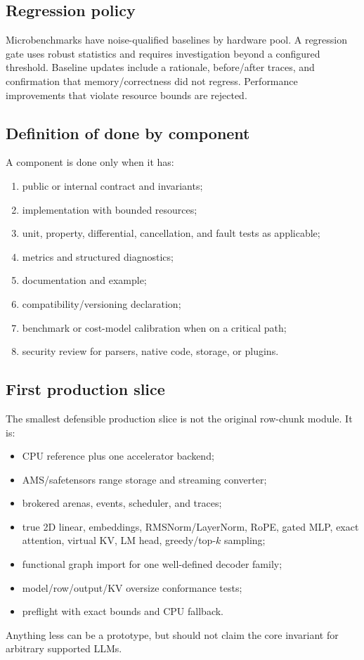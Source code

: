 \subsection{Regression policy}

Microbenchmarks have noise-qualified baselines by hardware pool. A regression gate uses robust statistics and requires investigation beyond a configured threshold. Baseline updates include a rationale, before/after traces, and confirmation that memory/correctness did not regress. Performance improvements that violate resource bounds are rejected.

\subsection{Definition of done by component}

A component is done only when it has:

\begin{enumerate}
  \item public or internal contract and invariants;
  \item implementation with bounded resources;
  \item unit, property, differential, cancellation, and fault tests as applicable;
  \item metrics and structured diagnostics;
  \item documentation and example;
  \item compatibility/versioning declaration;
  \item benchmark or cost-model calibration when on a critical path;
  \item security review for parsers, native code, storage, or plugins.
\end{enumerate}

\subsection{First production slice}

The smallest defensible production slice is not the original row-chunk module. It is:

\begin{itemize}
  \item CPU reference plus one accelerator backend;
  \item AMS/safetensors range storage and streaming converter;
  \item brokered arenas, events, scheduler, and traces;
  \item true 2D linear, embeddings, RMSNorm/LayerNorm, RoPE, gated MLP, exact attention, virtual KV, LM head, greedy/top-$k$ sampling;
  \item functional graph import for one well-defined decoder family;
  \item model/row/output/KV oversize conformance tests;
  \item preflight with exact bounds and CPU fallback.
\end{itemize}

Anything less can be a prototype, but should not claim the core invariant for arbitrary supported LLMs.
